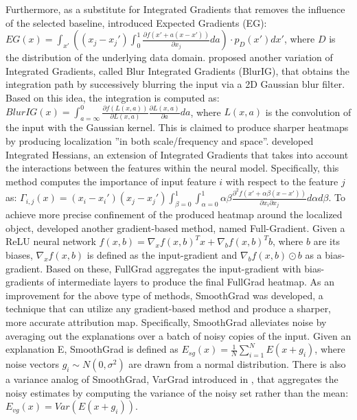 \documentclass[journal]{IEEEtran}
\begin{document}
Furthermore, as a substitute for Integrated Gradients that removes the influence of the selected baseline, \cite{Erion2019} introduced Expected Gradients (EG): $EG(x)=\int_{x'}\left ((x_j-x_j')\int_0^1\frac{\partial f(x'+a(x-x'))}{\partial x_j}da\right ) \cdot p_D(x')dx'$, where $D$ is the distribution of the underlying data domain.
\cite{Xu2020} proposed another variation of Integrated Gradients, called Blur Integrated Gradients (BlurIG), that obtains the integration path by successively blurring the input via a 2D Gaussian blur filter. Based on this idea, the integration is computed as: $BlurIG(x) = \int_{a=\infty}^0 \frac{\partial f(L(x,a))}{\partial L(x,a)} \frac{\partial L(x,a)}{\partial a} da$, where $L(x,a)$ is the convolution of the input with the Gaussian kernel. This is claimed to produce sharper heatmaps by producing localization ''in both scale/frequency and space''.
\cite{Janizek2021} developed Integrated Hessians, an extension of Integrated Gradients that takes into account the interactions between the features within the neural model. Specifically, this method computes the importance of input feature $i$ with respect to the feature $j$ as: $\Gamma_{i,j}(x)=(x_i-x_i')(x_j-x_j') \int_{\beta=0}^1 \int_{\alpha=0}^1 \alpha \beta \frac{\partial ^2 f(x'+\alpha \beta (x-x'))}{\partial x_i \partial x_j}d\alpha d\beta$.
To achieve more precise confinement of the produced heatmap around the localized object, \cite{Srinivas2019} developed another gradient-based method, named Full-Gradient. Given a ReLU neural network $f(x,b)=\nabla_x f(x,b)^Tx+\nabla_b f(x,b)^Tb$, where $b$ are its biases, $\nabla_x f(x,b)$ is defined as the input-gradient and $\nabla_b f(x,b) \odot b$ as a bias-gradient. Based on these, FullGrad aggregates the input-gradient with bias-gradients of intermediate layers to produce the final FullGrad heatmap.
As an improvement for the above type of methods, SmoothGrad \cite{Smilkov2017} was developed, a technique that can utilize any gradient-based method and produce a sharper, more accurate attribution map. Specifically, SmoothGrad alleviates noise by averaging out the explanations over a batch of noisy copies of the input. Given an explanation E, SmoothGrad is defined as $E_{sg}(x)=\frac{1}{N}\sum_{i=1}^N E(x+g_i)$, where noise vectors $g_i \sim N(0,\sigma^2)$ are drawn from a normal distribution.
There is also a variance analog of SmoothGrad, VarGrad introduced in \cite{Sundararajan2018}, that aggregates the noisy estimates by computing the variance of the noisy set rather than the mean: $E_{vg}(x)=Var(E(x+g_i))$.
\end{document}
